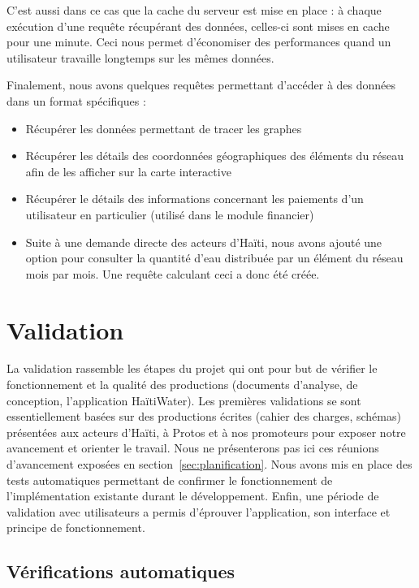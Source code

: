\documentclass{EPL-master-thesis-covers-FR}
\begin{document}
				C'est aussi dans ce cas que la cache du serveur est mise en place : à chaque exécution d'une requête récupérant des données, celles-ci sont mises en cache pour une minute. Ceci nous permet d'économiser des performances quand un utilisateur travaille longtemps sur les mêmes données.

				Finalement, nous avons quelques requêtes permettant d'accéder à des données dans un format spécifiques :

				\begin{itemize}
					\item Récupérer les données permettant de tracer les graphes
					\item Récupérer les détails des coordonnées géographiques des éléments du réseau afin de les afficher sur la carte interactive
					\item Récupérer le détails des informations concernant les paiements d'un utilisateur en particulier (utilisé dans le module financier)
					\item Suite à une demande directe des acteurs d'Haïti, nous avons ajouté une option pour consulter la quantité d'eau distribuée par un élément du réseau mois par mois. Une requête calculant ceci a donc été créée.
				\end{itemize}


	\chapter{Validation}

		La validation rassemble les étapes du projet qui ont pour but de vérifier le fonctionnement et la qualité des productions (documents d'analyse, de conception, l'application HaïtiWater). Les premières validations se sont essentiellement basées sur des productions écrites (cahier des charges, schémas) présentées aux acteurs d'Haïti, à Protos et à nos promoteurs pour exposer notre avancement et orienter le travail. Nous ne présenterons pas ici ces réunions d'avancement exposées en section~\ref{sec:planification}. Nous avons mis en place des tests automatiques permettant de confirmer le fonctionnement de l'implémentation existante durant le développement. Enfin, une période de validation avec utilisateurs a permis d'éprouver l'application, son interface et principe de fonctionnement.


		\section{Vérifications automatiques}
\end{document}
